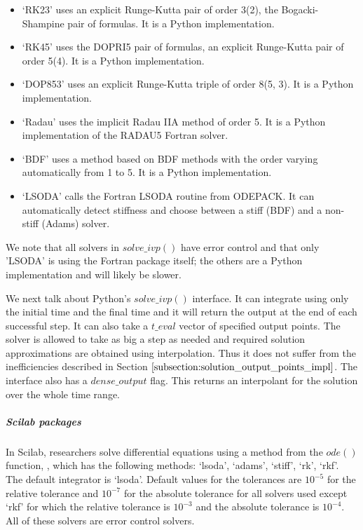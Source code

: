 \begin{itemize}
\item `RK23' uses an explicit Runge-Kutta pair of order 3(2), the Bogacki-Shampine pair of formulas. It is a Python implementation.

\item `RK45' uses the DOPRI5 pair of formulas, an explicit Runge-Kutta pair of order 5(4). It is a Python implementation.

\item `DOP853' uses an explicit Runge-Kutta triple of order 8(5, 3). It is a Python implementation.

\item `Radau' uses the implicit Radau IIA method of order 5. It is a Python implementation of the RADAU5 Fortran solver.

\item `BDF' uses a method based on BDF methods with the order varying automatically from 1 to 5. It is a Python implementation.

\item `LSODA' calls the Fortran LSODA routine from ODEPACK. It can automatically detect stiffness and choose between a stiff (BDF) and a non-stiff (Adams) solver.
\end{itemize}

We note that all solvers in $solve\_ivp()$ have error control and that only 'LSODA' is using the Fortran package itself; the others are a Python implementation and will likely be slower.

We next talk about Python's $solve\_ivp()$ interface. It can integrate using only the initial time and the final time and it will return the output at the end of each successful step. It can also take a $t\_eval$ vector of specified output points. The solver is allowed to take as big a step as needed and required solution approximations are obtained using interpolation. Thus it does not suffer from the inefficiencies described in Section $\ref{subsection:solution_output_points_impl}$. The interface also has a $dense\_output$ flag. This returns an interpolant for the solution over the whole time range.

\subparagraph{Scilab packages}
In Scilab, researchers solve differential equations using a method from the $ode()$ function, \cite{campbell2010modeling}, which has the following methods: `lsoda', `adams', `stiff', `rk', `rkf'. The default integrator is `lsoda'.
Default values for the tolerances are $10^{-5}$ for the relative tolerance and $10^{-7}$ for the absolute tolerance for all solvers used except `rkf' for which the relative tolerance is $10^{-3}$ and the absolute tolerance is $10^{-4}$. All of these solvers are error control solvers.

